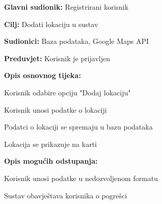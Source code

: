 					\noindent {}
					\begin{packed_item}
	
						\item \textbf{Glavni sudionik: }Registrirani korisnik
						\item  \textbf{Cilj:} Dodati lokaciju u sustav
						\item  \textbf{Sudionici:} Baza podataka, Google Maps API
						\item  \textbf{Preduvjet:} Korisnik je prijavljen
						\item  \textbf{Opis osnovnog tijeka:}
						
						\item[] \begin{packed_enum}
	
							\item Korisnik odabire opciju "Dodaj lokaciju"
							\item Korisnik unosi podatke o lokaciji
							\item Podatci o lokaciji se spremaju u bazu podataka
							\item Lokacija se prikazuje na karti

						\end{packed_enum}
						
						\item  \textbf{Opis mogućih odstupanja:}
						
						\item[] \begin{packed_item}
	
							\item[2.a] Korisnik unosi podatke u nedozvoljenom formatu 
							\item[] \begin{packed_enum}
								
								\item Sustav obavještava korisnika o pogrešci 
								
							\end{packed_enum}
							
						\end{packed_item}
						
					\end{packed_item}
					
